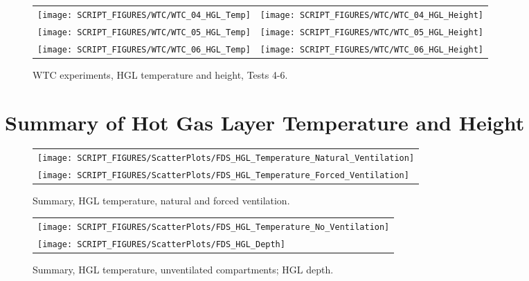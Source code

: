 \newpage

\begin{figure}[p]
\begin{tabular*}{\textwidth}{l@{\extracolsep{\fill}}r}
\texttt{[image: SCRIPT\_FIGURES/WTC/WTC\_04\_HGL\_Temp]} &
\texttt{[image: SCRIPT\_FIGURES/WTC/WTC\_04\_HGL\_Height]} \\
\texttt{[image: SCRIPT\_FIGURES/WTC/WTC\_05\_HGL\_Temp]} &
\texttt{[image: SCRIPT\_FIGURES/WTC/WTC\_05\_HGL\_Height]} \\
\texttt{[image: SCRIPT\_FIGURES/WTC/WTC\_06\_HGL\_Temp]} &
\texttt{[image: SCRIPT\_FIGURES/WTC/WTC\_06\_HGL\_Height]}
\end{tabular*}
\caption[WTC experiments, HGL temperature and height, Tests 4-6]
{WTC experiments, HGL temperature and height, Tests 4-6.}
\label{WTC_HGL_2}
\end{figure}


\clearpage

\section{Summary of Hot Gas Layer Temperature and Height}
\label{HGL Temperature, Natural Ventilation}
\label{HGL Temperature, Forced Ventilation}
\label{HGL Temperature, No Ventilation}
\label{HGL Depth}


\begin{figure}[!h]
\centering
\begin{tabular}{l}
\texttt{[image: SCRIPT\_FIGURES/ScatterPlots/FDS\_HGL\_Temperature\_Natural\_Ventilation]} \\
\texttt{[image: SCRIPT\_FIGURES/ScatterPlots/FDS\_HGL\_Temperature\_Forced\_Ventilation]}
\end{tabular}
\caption[Summary, HGL temperature, natural and forced ventilation]
{Summary, HGL temperature, natural and forced ventilation.}
\label{HGL_Summary_1}
\end{figure}

\newpage

\begin{figure}[!h]
\centering
\begin{tabular}{l}
\texttt{[image: SCRIPT\_FIGURES/ScatterPlots/FDS\_HGL\_Temperature\_No\_Ventilation]} \\
\texttt{[image: SCRIPT\_FIGURES/ScatterPlots/FDS\_HGL\_Depth]}
\end{tabular}
\caption[Summary, HGL temperature, unventilated compartments; HGL depth]
{Summary, HGL temperature, unventilated compartments; HGL depth.}
\label{HGL_Summary_2}
\end{figure}



